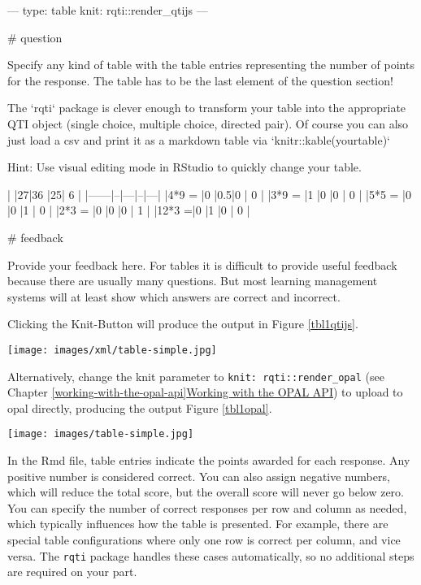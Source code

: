 \documentclass[twoside]{tufte-book}
\newenvironment{Shaded}{}{}
\begin{document}
\begin{Shaded}
\begin{Highlighting}
---
type: table
knit: rqti::render_qtijs
---

# question

Specify any kind of table with the table entries representing the number of
points for the response. The table has to be the last element of the question
section!

The `rqti` package is clever enough to transform your table into the appropriate
QTI object (single choice, multiple choice, directed pair). Of course you can
also just load a csv and print it as a markdown table via
`knitr::kable(yourtable)`

Hint: Use visual editing mode in RStudio to quickly change your table.

|      |27|36 |25| 6 |
|------|--|---|--|---|
|4*9 = |0 |0.5|0 | 0 |
|3*9 = |1 |0  |0 | 0 |
|5*5 = |0 |0  |1 | 0 |
|2*3 = |0 |0  |0 | 1 |
|12*3 =|0 |1  |0 | 0 |

# feedback

Provide your feedback here. For tables it is difficult to provide useful
feedback because there are usually many questions. But most learning management
systems will at least show which answers are correct and incorrect.
\end{Highlighting}
\end{Shaded}

Clicking the Knit-Button will produce the output in Figure \ref{tbl1qtijs}.

\begin{figure*}
\centering
\texttt{[image: images/xml/table-simple.jpg]}
\caption{\label{tbl1qtijs}Preview of table task rendered by qtijs}
\end{figure*}

\noindent Alternatively, change the knit parameter to \texttt{knit:\ rqti::render\_opal} (see Chapter \ref{working-with-the-opal-api}\href{api_opal.html}{Working with the OPAL API}) to upload to opal directly, producing the output Figure \ref{tbl1opal}.

\begin{figure*}
\centering
\texttt{[image: images/table-simple.jpg]}
\caption{\label{tbl1opal}Preview of table task rendered by OPAL}
\end{figure*}

In the Rmd file, table entries indicate the points awarded for each response. Any positive number is considered correct. You can also assign negative numbers, which will reduce the total score, but the overall score will never go below zero. You can specify the number of correct responses per row and column as needed, which typically influences how the table is presented. For example, there are special table configurations where only one row is correct per column, and vice versa. The \texttt{rqti} package handles these cases automatically, so no additional steps are required on your part.
\end{document}
